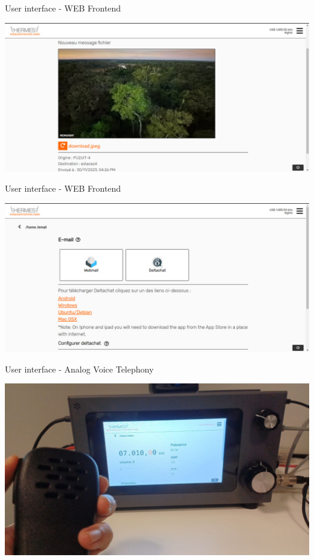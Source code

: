 \documentclass[aspectratio=169,xcolor={x11names,svgnames,dvipsnames}]{beamer}
\begin{document}
\begin{frame}{User interface - WEB Frontend}

  \vspace{-0.15cm}
  \begin{center}
    \includegraphics[width=.9\columnwidth]{hermes-ui4.jpg}
  \end{center}

\end{frame}


\begin{frame}{User interface - WEB Frontend}

  \vspace{-0.15cm}
  \begin{center}
    \includegraphics[width=.9\columnwidth]{hermes-ui6.jpg}
  \end{center}

\end{frame}

\begin{frame}{User interface - Analog Voice Telephony}

  \vspace{-0.15cm}
  \begin{center}
    \includegraphics[width=.9\columnwidth]{hermes5.jpeg}
  \end{center}

\end{frame}
\end{document}
